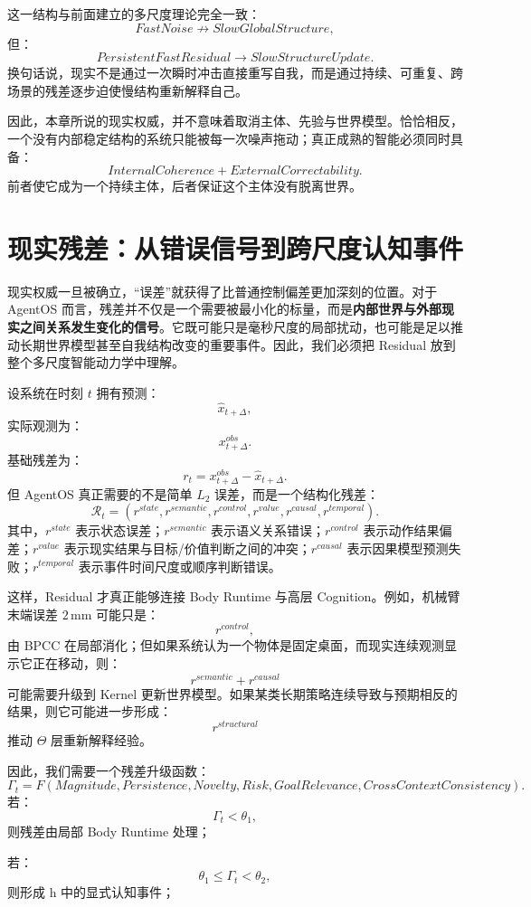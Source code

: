 这一结构与前面建立的多尺度理论完全一致：
\[
FastNoise
\nrightarrow
SlowGlobalStructure,
\]
但：
\[
PersistentFastResidual
\rightarrow
SlowStructureUpdate.
\]
换句话说，现实不是通过一次瞬时冲击直接重写自我，而是通过持续、可重复、跨场景的残差逐步迫使慢结构重新解释自己。

因此，本章所说的现实权威，并不意味着取消主体、先验与世界模型。恰恰相反，一个没有内部稳定结构的系统只能被每一次噪声拖动；真正成熟的智能必须同时具备：
\[
\boxed{
InternalCoherence
+
ExternalCorrectability.
}
\]
前者使它成为一个持续主体，后者保证这个主体没有脱离世界。

\section{现实残差：从错误信号到跨尺度认知事件}

现实权威一旦被确立，``误差''就获得了比普通控制偏差更加深刻的位置。对于 AgentOS 而言，残差并不仅是一个需要被最小化的标量，而是\textbf{内部世界与外部现实之间关系发生变化的信号}。它既可能只是毫秒尺度的局部扰动，也可能是足以推动长期世界模型甚至自我结构改变的重要事件。因此，我们必须把 Residual 放到整个多尺度智能动力学中理解。

设系统在时刻 $t$ 拥有预测：
\[
\hat{x}_{t+\Delta},
\]
实际观测为：
\[
x^{obs}_{t+\Delta}.
\]
基础残差为：
\[
r_t
=
x^{obs}_{t+\Delta}
-
\hat{x}_{t+\Delta}.
\]
但 AgentOS 真正需要的不是简单 $L_2$ 误差，而是一个结构化残差：
\[
\boxed{
\mathcal R_t
=
(
r^{state},
r^{semantic},
r^{control},
r^{value},
r^{causal},
r^{temporal}
).
}
\]
其中，$r^{state}$ 表示状态误差；$r^{semantic}$ 表示语义关系错误；$r^{control}$ 表示动作结果偏差；$r^{value}$ 表示现实结果与目标/价值判断之间的冲突；$r^{causal}$ 表示因果模型预测失败；$r^{temporal}$ 表示事件时间尺度或顺序判断错误。

这样，Residual 才真正能够连接 Body Runtime 与高层 Cognition。例如，机械臂末端误差 $2\,\mathrm{mm}$ 可能只是：
\[
r^{control},
\]
由 BPCC 在局部消化；但如果系统认为一个物体是固定桌面，而现实连续观测显示它正在移动，则：
\[
r^{semantic}+r^{causal}
\]
可能需要升级到 Kernel 更新世界模型。如果某类长期策略连续导致与预期相反的结果，则它可能进一步形成：
\[
r^{structural}
\]
推动 $\Theta$ 层重新解释经验。

因此，我们需要一个残差升级函数：
\[
\Gamma_t
=
F
\left(
Magnitude,
Persistence,
Novelty,
Risk,
GoalRelevance,
CrossContextConsistency
\right).
\]
若：
\[
\Gamma_t<\theta_1,
\]
则残差由局部 Body Runtime 处理；

若：
\[
\theta_1\leq\Gamma_t<\theta_2,
\]
则形成 h 中的显式认知事件；

